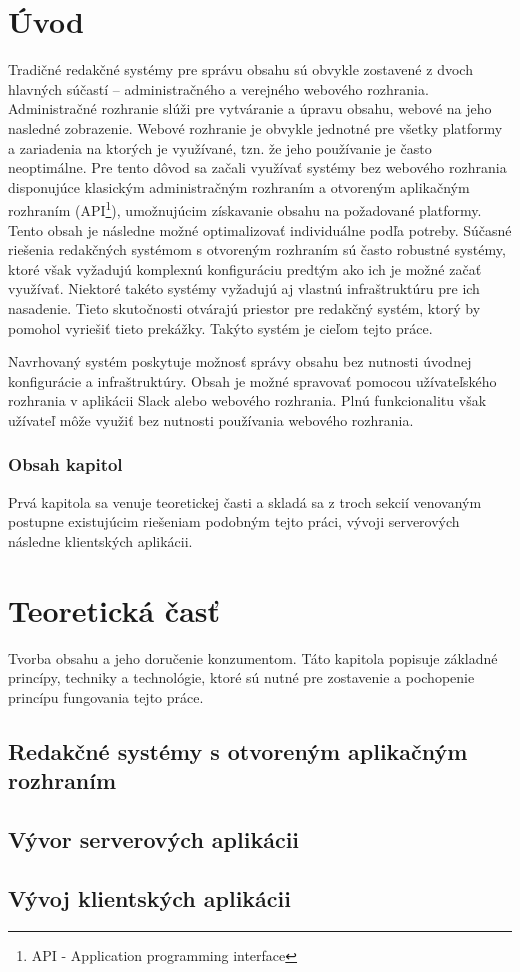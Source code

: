\chapter{Úvod}
Tradičné redakčné systémy pre správu obsahu sú obvykle zostavené z dvoch hlavných súčastí -- administračného a verejného webového rozhrania. Administračné rozhranie slúži pre vytváranie a úpravu obsahu, webové na jeho nasledné zobrazenie. Webové rozhranie je obvykle jednotné pre všetky platformy a zariadenia na ktorých je využívané, tzn. že jeho používanie je často neoptimálne. Pre tento dôvod sa začali využívať systémy bez webového rozhrania disponujúce klasickým administračným rozhraním a otvoreným aplikačným rozhraním (API\footnote{API - Application programming interface}), umožnujúcim získavanie obsahu na požadované platformy. Tento obsah je následne možné optimalizovať individuálne podľa potreby. Súčasné riešenia redakčných systémom s otvoreným rozhraním sú často robustné systémy, ktoré však vyžadujú komplexnú konfiguráciu predtým ako ich je možné začať využívať. Niektoré takéto systémy vyžadujú aj vlastnú infraštruktúru pre ich nasadenie. Tieto skutočnosti otvárajú priestor pre redakčný systém, ktorý by pomohol vyriešiť tieto prekážky. Takýto systém je cieľom tejto práce.

Navrhovaný systém poskytuje možnosť správy obsahu bez nutnosti úvodnej konfigurácie a infraštruktúry. Obsah je možné spravovať pomocou užívateľského rozhrania v aplikácii Slack alebo webového rozhrania. Plnú funkcionalitu však užívateľ môže využiť bez nutnosti používania webového rozhrania.

\subsection*{Obsah kapitol}
Prvá kapitola sa venuje teoretickej časti a skladá sa z troch sekcií venovaným postupne existujúcim riešeniam podobným tejto práci, vývoji serverových následne klientských aplikácii.


\chapter{Teoretická časť}
Tvorba obsahu a jeho doručenie konzumentom. Táto kapitola popisuje základné princípy, techniky a technológie, ktoré sú nutné pre zostavenie a pochopenie princípu fungovania tejto práce.
\section{Redakčné systémy s otvoreným aplikačným rozhraním}

\section{Vývor serverových aplikácii}
\section{Vývoj klientských aplikácii}
